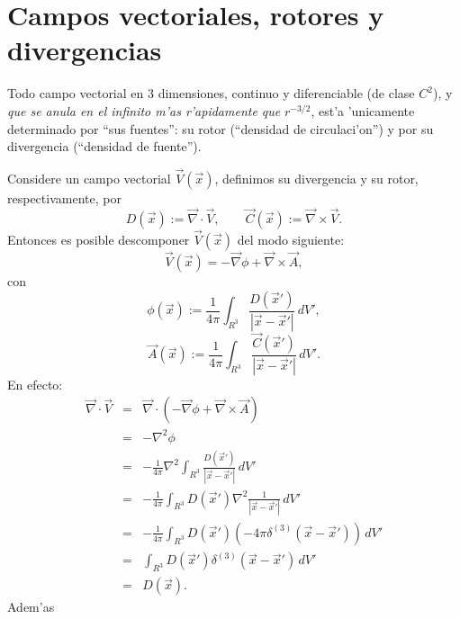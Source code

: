 \chapter{Campos vectoriales, rotores y divergencias}\label{Apcamps}
Todo campo vectorial en 3 dimensiones, continuo y diferenciable (de clase $C^2$), y \textit{que se anula en el infinito m'as r'apidamente que} $r^{-3/2}$, est'a 'unicamente determinado por ``sus fuentes'': su rotor (``densidad de circulaci'on'') y por su divergencia (``densidad de fuente'').

Considere un campo vectorial $\vec V(\vec x)$, definimos su divergencia y su
rotor, respectivamente, por
\begin{equation}
 D(\vec x):=\vec\nabla\cdot\vec V, \qquad \vec C(\vec x):=\vec\nabla\times\vec
V. \label{divrot}
\end{equation}
Entonces es posible descomponer $\vec V(\vec x)$ del modo siguiente:
\begin{equation}
 \vec V(\vec x)=-\vec\nabla\phi+\vec\nabla\times\vec A, \label{decomp1}
\end{equation}
con
\begin{equation}
 \phi(\vec x):=\frac{1}{4\pi}\int_{R^3}\frac{D(\vec x')}{\left|\vec x-\vec
x'\right|}\,dV',
\end{equation}
\begin{equation}
 \vec A(\vec x):=\frac{1}{4\pi}\int_{R^3}\frac{\vec C(\vec x')}{\left|\vec
x-\vec x'\right|}\,dV' .
\end{equation}
En efecto:
\begin{eqnarray}
\vec\nabla\cdot\vec
V&=&\vec\nabla\cdot\left(-\vec\nabla\phi+\vec\nabla\times\vec
A\right) \\
&=&-\nabla^2\phi \\
&=&- \frac{1}{4\pi}\nabla^2\int_{R^3}\frac{D(\vec x')}{\left|\vec x-\vec
x'\right|}\,dV'\\
&=&- \frac{1}{4\pi}\int_{R^3}D(\vec x')\nabla^2\frac{1}{\left|\vec x-\vec
x'\right|}\,dV'\\
&=&- \frac{1}{4\pi}\int_{R^3}D(\vec
x')\left(-4\pi\delta^{(3)}(\vec x-\vec x')\right)\,dV'\\
&=&\int_{R^3}D(\vec x')\delta^{(3)}(\vec x-\vec x')\,dV'\\
&=&D(\vec x).
\end{eqnarray}
Adem'as
